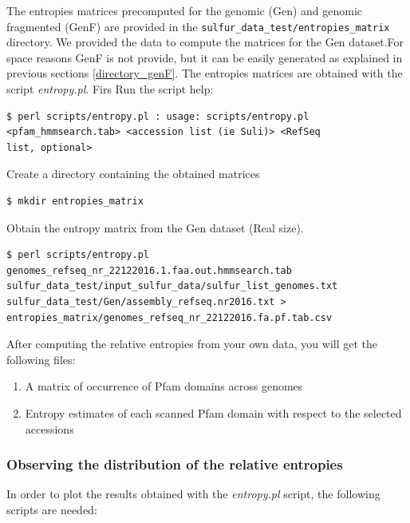 \documentclass[12pt]{report}
\begin{document}
The entropies matrices precomputed for the genomic (Gen) and genomic fragmented (GenF) are provided in the 
\verb+sulfur_data_test/entropies_matrix+  directory.  
We provided the data to compute the matrices for the Gen dataset.For space reasons GenF is not provide, but it can be easily generated as explained in previous sections \ref{directory_genF}. 
The entropies matrices are obtained with the script \textit{entropy.pl}.
Firs Run the script help:
\begin{verbatim}
$ perl scripts/entropy.pl : usage: scripts/entropy.pl 
<pfam_hmmsearch.tab> <accession list (ie Suli)> <RefSeq 
list, optional>
\end{verbatim}
Create a directory containing the obtained matrices 
\begin{verbatim}
$ mkdir entropies_matrix
\end{verbatim}
Obtain the entropy matrix from the Gen dataset (Real size).
\begin{verbatim}
$ perl scripts/entropy.pl genomes_refseq_nr_22122016.1.faa.out.hmmsearch.tab 
sulfur_data_test/input_sulfur_data/sulfur_list_genomes.txt
sulfur_data_test/Gen/assembly_refseq.nr2016.txt > 
entropies_matrix/genomes_refseq_nr_22122016.fa.pf.tab.csv
\end{verbatim}

After computing the relative entropies from your own data, you will get the following files: 
\begin{enumerate}
\item  A matrix of occurrence of Pfam domains across genomes
\item Entropy estimates of each scanned Pfam domain with respect to the selected accessions
\end{enumerate}

\subsubsection*{Observing the distribution of the relative entropies}

In order to plot the results obtained with the \textit{entropy.pl} script, the
following scripts are needed:   
\end{document}

